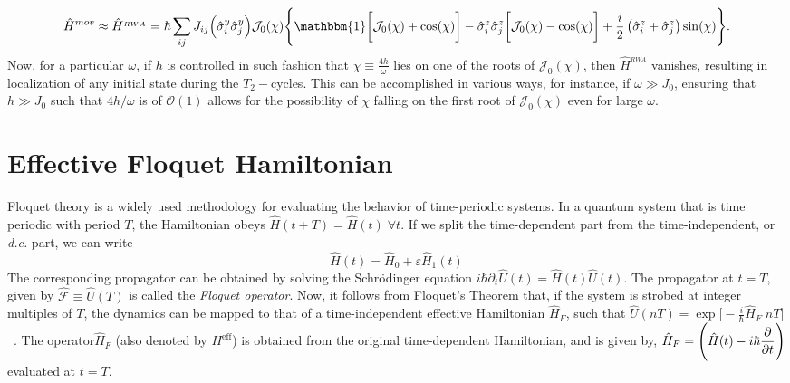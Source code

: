 \documentclass[
nofootinbib,
reprint,
superscriptaddress,
amsmath,amssymb,showkeys,
aps,
prb,
]{revtex4-2}
\begin{document}
	\begin{equation}
		\hat{H}^{mov}\approx \hat{H}^{_{RWA}} = \hbar\sum_{ij} J_{ij} \Big(\hat{\sigma}^y_i\hat{\sigma}^y_j\Big) \mathcal{J}_0(\chi)\Bigg\{\mathbbm{1}\bigg[\mathcal{J}_0(\chi) + \cos(\chi)\bigg] -\hat{\sigma}^z_i\hat{\sigma}^z_j \bigg[\mathcal{J}_0(\chi) - \cos(\chi)\bigg] + \frac{i}{2} \left(\hat{\sigma}^z_i + \hat{\sigma}^z_j\right) \sin(\chi)\Bigg\}.
		\label{eq:hrwa}
	\end{equation}	
	Now, for a particular $\omega$, if $h$ is controlled in such fashion that $\chi\equiv\frac{4h}{\omega}$ lies on one of the roots of $\mathcal{J}_0(\chi)$, then $\hat{H}^{_{RWA}}$ vanishes, resulting in localization of any initial state during the $T_2-$cycles. This can be accomplished in various ways, for instance, if $\omega\gg J_0$, ensuring that $h\gg J_0$ such that $4h/\omega$ is of $\mathcal{O}(1)$ allows for the possibility of $\chi$ falling on the first root of $\mathcal{J}_0(\chi)$ even for large $\omega$.
	
	\section{\label{sec:AppendixB} Effective Floquet Hamiltonian}
	
	Floquet theory is a widely used methodology for evaluating the behavior of time-periodic systems.  In a quantum system that is time periodic with period $T$, the Hamiltonian obeys $\hat{H}(t+T) = \hat{H}(t)\;\forall t$. If we split the time-dependent part from the time-independent, or \textit{d.c.} part, we can write
	\begin{equation*}
		\hat{H}(t) = \hat{H}_0 + \varepsilon \hat{H}_1(t)
	\end{equation*}
	The corresponding propagator can be obtained by solving the Schr\"odinger equation $\displaystyle{i\hbar \partial_t \hat{U}(t) = \hat{H}(t) \hat{U}(t)}$.  The propagator at $t=T$, given by $ \hat{\mathcal{F}}\equiv \hat{U}(T)$ is called the \textit{Floquet operator}. Now, it follows from Floquet's Theorem that, if the system is strobed at integer multiples of $T$, the dynamics can be mapped to that of a time-independent effective Hamiltonian $\hat{H}_F$, such that  $\displaystyle\hat{U}(nT) = \exp\bigg[-\frac{i}{\hbar}\hat{H}_F\; nT \bigg]$~\cite{Eckardt_2015}.  The operator$\hat{H}_F$ (also denoted by $H^\mathrm{eff}$) is obtained from the original time-dependent Hamiltonian, and is given by, $\displaystyle \hat{H}_F = \Bigg(\hat{H}(t) - i\hbar \pdv{t}\Bigg)$ evaluated at $t=T$. 
	
\end{document}
